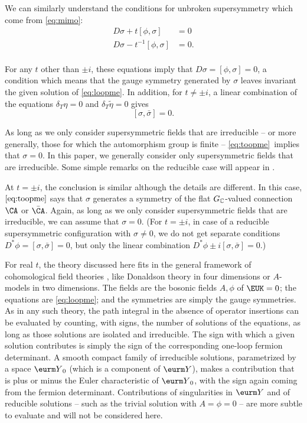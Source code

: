 We can similarly understand the  conditions for unbroken
supersymmetry which come from \eqref{eq:mimo}:
\setcounter{equation}{29}
\begin{equation}\label{eq:toopme}
\begin{aligned}D\sigma + t[\phi,\sigma]& = 0\\
                     D\sigma - t^{-1}[\phi,\sigma]& = 0.\\
                     \end{aligned}
\end{equation}

For any $t$ other than $\pm i$, these equations imply that
$D\sigma=[\phi,\sigma]=0$, a condition which means that the gauge
symmetry generated by $\sigma$ leaves invariant the given solution
of \eqref{eq:loopme}.
In addition, for $t\not=\pm i$, a linear combination of the equations $\delta_T\eta=0$
and $\delta_T\tilde \eta=0$ gives
\setcounter{equation}{30}
\begin{equation}\label{eq:woopem}
[\sigma,\bar\sigma]=0.
\end{equation}

As long as we only consider
supersymmetric fields that are irreducible -- or more generally,
those for which the automorphism group is finite -- \eqref{eq:toopme}\
implies that $\sigma=0$. In this paper, we generally consider only
supersymmetric fields that are irreducible. Some simple remarks on
the  reducible case will appear in \cite{ref26}.

At $t=\pm i$, the conclusion is similar although the details are different.  In this case,
$\eqref{eq:toopme}$ says that $\sigma$ generates a symmetry of the flat $G_\Bbb{C}$-valued connection
$\CA$ or $\bar\CA$.  Again, as long as we only consider supersymmetric fields that are irreducible,
we can assume that $\sigma=0$.  (For $t=\pm i$, in case of a reducible supersymmetric configuration
with $\sigma\not=0$, we do not get separate conditions $D^*\phi=[\sigma,\bar\sigma]=0$, but only
the linear combination $D^*\phi\pm i[\sigma,\bar\sigma]=0$.)

For real $t$, the theory discussed here fits in the general
framework of cohomological field theories \cite{ref59}, like Donaldson theory in four
dimensions or $A$-models in two dimensions.  The fields are the
bosonic fields $A,\phi$ of ${\EUK}=0$; the equations are \eqref{eq:loopme};
and the symmetries are simply the gauge symmetries. As in any such
theory, the path integral in the absence of operator insertions
can be evaluated by counting, with signs, the number of solutions
of the equations, as long as those solutions are isolated and
irreducible.  The sign with which a given solution contributes is
simply  the sign of the corresponding one-loop fermion
determinant. A smooth compact family of irreducible solutions,
parametrized by a space ${\eurm Y}_0$ (which is a component of
${\eurm Y}$), makes a contribution that is plus or minus the Euler
characteristic of ${\eurm Y}_0$, with the sign again coming from
the fermion determinant. Contributions of singularities in ${\eurm
Y}$ and of reducible solutions -- such as the trivial solution
with $A=\phi=0$ -- are more subtle to evaluate and will not be
considered here.

